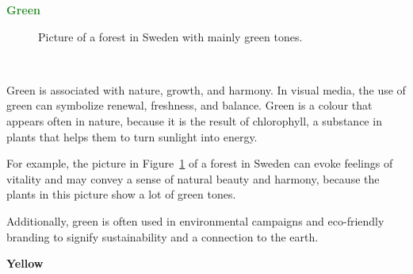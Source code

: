 \documentclass[../MasterThesis.tex]{subfiles}
\begin{document}
\textbf{\textcolor{ForestGreen}{Green}}

%
%
\begin{minipage}{0.5\textwidth}
	\begin{figure}[H]
		\begin{center}
			\caption[Picture of a forest in Sweden with mainly green tones.]{Picture of a forest in Sweden with mainly green tones.}
			\label{figure:green}
		\end{center}
	\end{figure}\hfill
\end{minipage}\begin{minipage}{0.05\textwidth}
	\ 
\end{minipage}\begin{minipage}{0.45\textwidth}
	Green is associated with nature, growth, and harmony. In visual media, the use of green can symbolize renewal, freshness, and balance. Green is a colour that appears often in nature, because it is the result of chlorophyll, a substance in plants that helps them to turn sunlight into energy.~\cite{green, colour2}
	
	For example, the picture in Figure~\ref{figure:green} of a forest in Sweden can evoke feelings of vitality  and  may convey a sense of natural beauty and harmony, because the plants in this picture show a lot of green tones.~\cite{greenwashing}
	

	
	
\end{minipage}

	\vspace*{-0.6em}

	Additionally, green is often used in environmental campaigns and eco-friendly branding to signify sustainability and a connection to the earth. 








\newpage
\textbf{\textcolor{YellowOrange}{Yellow}}
\end{document}
